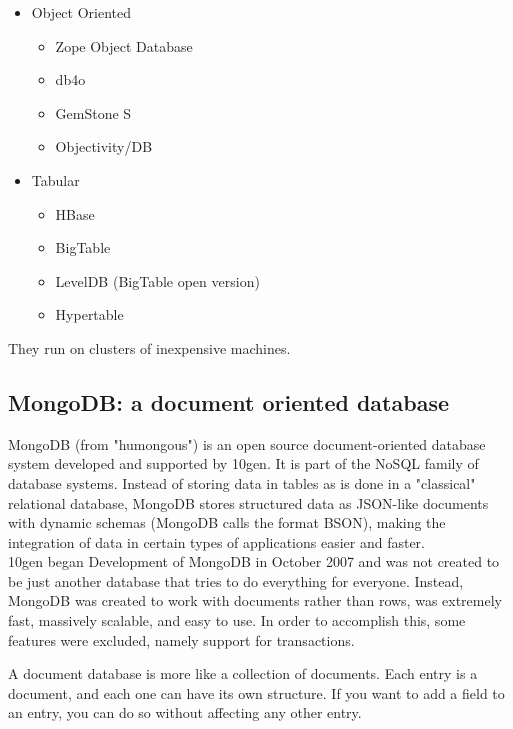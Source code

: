 \begin{itemize}
\item Object Oriented
  
  \begin{itemize}
    \item Zope Object Database
    \item db4o
    \item GemStone S
    \item Objectivity/DB
  \end{itemize}

\item Tabular

  \begin{itemize}
    \item HBase
    \item BigTable
    \item LevelDB (BigTable open version)
    \item Hypertable
  \end{itemize}
  

\end{itemize}

They run on clusters of inexpensive machines.\\



\subsection{MongoDB: a document oriented database}

MongoDB (from "humongous") is an open source document-oriented database system developed and supported by 10gen. It is part of the NoSQL family of database systems. Instead of storing data in tables as is done in a "classical" relational database, MongoDB stores structured data as JSON-like documents with dynamic schemas (MongoDB calls the format BSON), making the integration of data in certain types of applications easier and faster. \\

10gen began Development of MongoDB in October 2007 and was not created to be just another database that tries to do everything for everyone. Instead, MongoDB was created to work with documents rather than rows, was extremely fast, massively scalable, and easy to use. In order to accomplish this, some features were excluded, namely support for transactions.

\begin{shaded}A document database is more like a collection of documents. Each entry is a document, and each one can have its own structure. If you want to add a field to an entry, you can do so without affecting any other entry.\end{shaded} 

